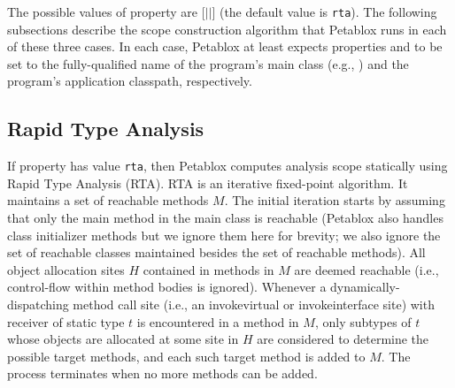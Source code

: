 The possible values of property  are
[$|$$|$] (the default value is {\tt rta}).
The following subsections describe the scope construction algorithm
that Petablox runs in each of these three cases.
In each case, Petablox at
least expects properties  and
 to be set to the fully-qualified name of the
program's main class (e.g., ) and the
program's application classpath, respectively.

\subsection{Rapid Type Analysis}

If property  has value {\tt rta}, then Petablox
computes analysis scope statically using Rapid Type Analysis (RTA).
RTA is an iterative fixed-point algorithm.  It maintains a set of
reachable methods $M$.  The initial iteration starts by assuming that
only the main method in the main class is reachable (Petablox also
handles class initializer methods but we ignore them here for brevity;
we also ignore the set of reachable classes maintained besides the set
of reachable methods).  All object allocation sites $H$ contained in
methods in $M$ are deemed reachable (i.e., control-flow within method
bodies is ignored).  Whenever a dynamically-dispatching method call
site (i.e., an invokevirtual or invokeinterface site) with receiver of
static type $t$ is encountered in a method in $M$, only subtypes of
$t$ whose objects are allocated at some site in $H$ are considered to
determine the possible target methods, and each such target method is
added to $M$.  The process terminates when no more methods can be
added.


